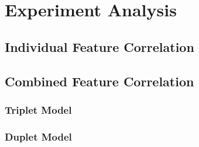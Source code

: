 \chapter{Experiment Analysis}
\label{chp:b4}

\section{Individual Feature Correlation}
\section{Combined Feature Correlation}
\subsection{Triplet Model}
\subsection{Duplet Model}